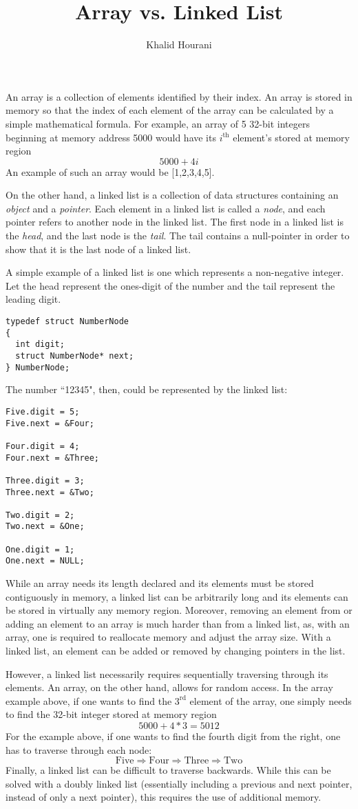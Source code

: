 \documentclass[a4paper]{article}
\title{Array vs. Linked List}
\author{Khalid Hourani}
\begin{document}
An array is a collection of elements identified by their index. An array is stored in memory so that the index of each element of the array can be calculated by a simple mathematical formula. For example, an array of 5 32-bit integers beginning at memory address 5000 would have its $i^{\text{th}}$ element's stored at memory region \[5000 + 4i\] An example of such an array would be [1,2,3,4,5]. 

On the other hand, a linked list is a collection of data structures containing an \textit{object} and a \textit{pointer}. Each element in a linked list is called a \textit{node}, and each pointer refers to another node in the linked list. The first node in a linked list is the \textit{head}, and the last node is the \textit{tail}. The tail contains a null-pointer in order to show that it is the last node of a linked list. 

A simple example of a linked list is one which represents a non-negative integer. Let the head represent the ones-digit of the number and the tail represent the leading digit.

\begin{verbatim}
typedef struct NumberNode
{
  int digit;
  struct NumberNode* next;
} NumberNode;
\end{verbatim}

The number ``12345", then, could be represented by the linked list:

\begin{verbatim}
Five.digit = 5;
Five.next = &Four;

Four.digit = 4;
Four.next = &Three;

Three.digit = 3;
Three.next = &Two;

Two.digit = 2;
Two.next = &One;

One.digit = 1;
One.next = NULL;
\end{verbatim}

While an array needs its length declared and its elements must be stored contiguously in memory, a linked list can be arbitrarily long and its elements can be stored in virtually any memory region. Moreover, removing an element from or adding an element to an array is much harder than from a linked list, as, with an array, one is required to reallocate memory and adjust the array size. With a linked list, an element can be added or removed by changing pointers in the list. 

However, a linked list necessarily requires sequentially traversing through its elements. An array, on the other hand, allows for random access. In the array example above, if one wants to find the $3^{\text{rd}}$ element of the array, one simply needs to find the 32-bit integer stored at memory region \[5000 + 4 * 3 = 5012\] For the example above, if one wants to find the fourth digit from the right, one has to traverse through each node: \[\text{Five} \Rightarrow \text{Four} \Rightarrow \text{Three} \Rightarrow \text{Two}\] Finally, a linked list can be difficult to traverse backwards. While this can be solved with a doubly linked list (essentially including a previous and next pointer, instead of only a next pointer), this requires the use of additional memory.
\end{document}
